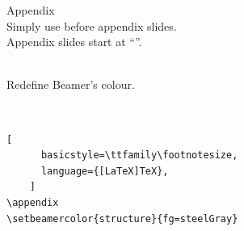 \documentclass[aspectratio=169,12pt]{beamer}
\begin{document}
\begin{frame}[fragile]{Appendix}
  \\
  Simply use  before appendix slides.\\
  Appendix slides start at ``''.

  \medskip
  \\
  Redefine Beamer's  colour.

  \medskip
  \\
  \begin{lstlisting}[
      basicstyle=\ttfamily\footnotesize,
      language={[LaTeX]TeX},
    ]
\appendix
\setbeamercolor{structure}{fg=steelGray}
  \end{lstlisting}

\end{frame}
\end{document}
